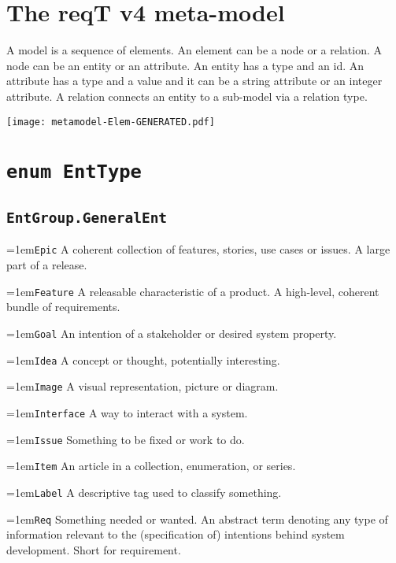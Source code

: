 \documentclass[a4paper,oneside]{article}
\begin{document}
\fontsize{9.1}{11}\selectfont

\begin{multicols*}{4}

\section*{The reqT v4 meta-model}
\raggedright
A model is a sequence of elements. An element can be a node or a relation. A node can be an entity or an attribute. An entity has a type and an id. An attribute has a type and a value and it can be a string attribute or an integer attribute. A relation connects an entity to a sub-model via a relation type.

\noindent\hspace*{-2.1em}\texttt{[image: metamodel-Elem-GENERATED.pdf]}

\section*{\texttt{enum EntType}}
\subsection*{\texttt{EntGroup.GeneralEnt}}
\hangindent=1em\lstinline+Epic+ A coherent collection of features, stories, use cases or issues. A large part of a release. 

\hangindent=1em\lstinline+Feature+ A releasable characteristic of a product. A high-level, coherent bundle of requirements. 

\hangindent=1em\lstinline+Goal+ An intention of a stakeholder or desired system property. 

\hangindent=1em\lstinline+Idea+ A concept or thought, potentially interesting. 

\hangindent=1em\lstinline+Image+ A visual representation, picture or diagram. 

\hangindent=1em\lstinline+Interface+ A way to interact with a system. 

\hangindent=1em\lstinline+Issue+ Something to be fixed or work to do. 

\hangindent=1em\lstinline+Item+ An article in a collection, enumeration, or series. 

\hangindent=1em\lstinline+Label+ A descriptive tag used to classify something. 

\hangindent=1em\lstinline+Req+ Something needed or wanted. An abstract term denoting any type of information relevant to the (specification of) intentions behind system development. Short for requirement. 


\end{multicols*}
\end{document}
